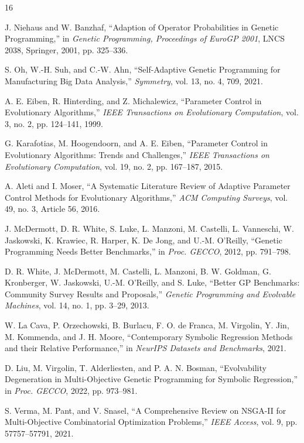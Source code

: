 \documentclass[a4paper,10pt,twocolumn]{ltjsarticle}
\begin{document}
\begin{thebibliography}{16}
\footnotesize

J. Niehaus and W. Banzhaf,
``Adaption of Operator Probabilities in Genetic Programming,''
in \emph{Genetic Programming, Proceedings of EuroGP 2001},
LNCS 2038, Springer, 2001, pp. 325--336.

S. Oh, W.-H. Suh, and C.-W. Ahn,
``Self-Adaptive Genetic Programming for Manufacturing Big Data Analysis,''
\emph{Symmetry}, vol. 13, no. 4, 709, 2021.

A. E. Eiben, R. Hinterding, and Z. Michalewicz,
``Parameter Control in Evolutionary Algorithms,''
\emph{IEEE Transactions on Evolutionary Computation}, vol. 3, no. 2,
pp. 124--141, 1999.

G. Karafotias, M. Hoogendoorn, and A. E. Eiben,
``Parameter Control in Evolutionary Algorithms: Trends and Challenges,''
\emph{IEEE Transactions on Evolutionary Computation}, vol. 19, no. 2,
pp. 167--187, 2015.

A. Aleti and I. Moser,
``A Systematic Literature Review of Adaptive Parameter Control Methods for Evolutionary Algorithms,''
\emph{ACM Computing Surveys}, vol. 49, no. 3, Article 56, 2016.

J. McDermott, D. R. White, S. Luke, L. Manzoni, M. Castelli,
L. Vanneschi, W. Jaskowski, K. Krawiec, R. Harper, K. De Jong,
and U.-M. O'Reilly,
``Genetic Programming Needs Better Benchmarks,''
in \emph{Proc. GECCO}, 2012, pp. 791--798.

D. R. White, J. McDermott, M. Castelli, L. Manzoni,
B. W. Goldman, G. Kronberger, W. Jaskowski, U.-M. O'Reilly, and S. Luke,
``Better GP Benchmarks: Community Survey Results and Proposals,''
\emph{Genetic Programming and Evolvable Machines}, vol. 14, no. 1,
pp. 3--29, 2013.

W. La Cava, P. Orzechowski, B. Burlacu, F. O. de Franca,
M. Virgolin, Y. Jin, M. Kommenda, and J. H. Moore,
``Contemporary Symbolic Regression Methods and their Relative Performance,''
in \emph{NeurIPS Datasets and Benchmarks}, 2021.

D. Liu, M. Virgolin, T. Alderliesten, and P. A. N. Bosman,
``Evolvability Degeneration in Multi-Objective Genetic Programming for Symbolic Regression,''
in \emph{Proc. GECCO}, 2022, pp. 973--981.

S. Verma, M. Pant, and V. Snasel,
``A Comprehensive Review on NSGA-II for Multi-Objective Combinatorial Optimization Problems,''
\emph{IEEE Access}, vol. 9, pp. 57757--57791, 2021.


\end{thebibliography}
\end{document}
